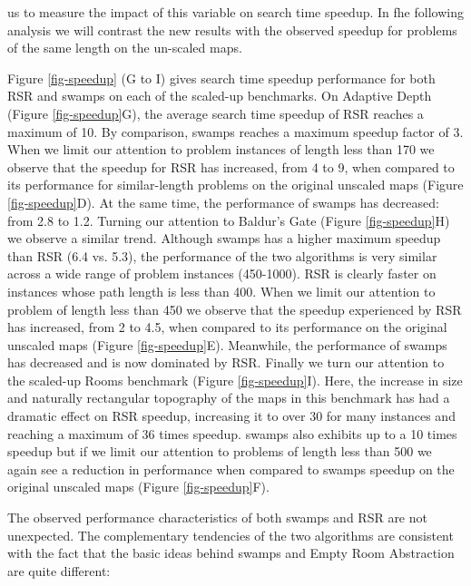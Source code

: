us to measure the impact of this variable on search time speedup.
In fhe following analysis we will contrast the new
results with the observed speedup for problems of the same length on the un-scaled maps.
\par
Figure \ref{fig-speedup} (G to I) gives search time speedup performance for both RSR and swamps
on each of the scaled-up benchmarks.
On Adaptive Depth (Figure \ref{fig-speedup}G), the average search time speedup of RSR reaches a maximum of 10. 
By comparison, swamps reaches a maximum speedup factor of 3.
When we limit our attention to problem instances of length less than 170 we observe that the speedup 
for RSR has increased, from 4 to 9, when compared to its performance for similar-length problems on the original 
unscaled maps (Figure \ref{fig-speedup}D). 
At the same time, the performance of swamps has decreased: from 2.8 to 1.2.
Turning our attention to Baldur's Gate (Figure \ref{fig-speedup}H) we observe a similar trend.
Although swamps has a higher maximum speedup than RSR (6.4 vs. 5.3), the performance of the two 
algorithms is very similar across a wide range of problem instances (450-1000).
RSR is clearly faster on instances whose path length is less than 400.
When we limit our attention to problem of length less than 450 we observe that the speedup experienced by
RSR has increased, from 2 to 4.5, when compared to its performance on the original unscaled maps
(Figure \ref{fig-speedup}E).
Meanwhile, the performance of swamps has decreased and is now dominated by RSR.
Finally we turn our attention to the scaled-up Rooms benchmark (Figure \ref{fig-speedup}I).
Here, the increase in size and naturally rectangular topography of the maps in this benchmark
has had a dramatic effect on RSR speedup, increasing it to over 30 for many
instances and reaching a maximum of 36 times speedup.
swamps also exhibits up to a 10 times speedup but if we limit our attention to problems of
length less than 500 we again see a reduction in performance when compared to swamps speedup
on the original unscaled maps (Figure \ref{fig-speedup}F). 
\par
The observed performance characteristics of both swamps and RSR
are not unexpected.
The complementary tendencies of the two algorithms
are consistent with the fact that 
the basic ideas behind swamps and Empty Room Abstraction are quite different:
